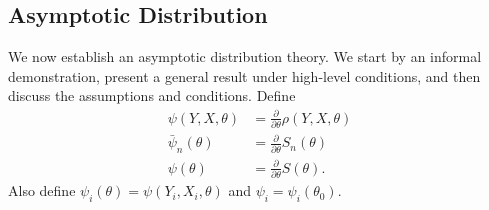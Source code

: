 \documentclass[10pt]{article}
\begin{document}
\subsection{Asymptotic Distribution}
We now establish an asymptotic distribution theory. We start by an informal demonstration, present a general result under high-level conditions, and then discuss the assumptions and conditions. Define
$$
\begin{aligned}
\psi(Y, X, \theta) &=\frac{\partial}{\partial \theta} \rho(Y, X, \theta) \\
\bar{\psi}_{n}(\theta) &=\frac{\partial}{\partial \theta} S_{n}(\theta) \\
\psi(\theta) &=\frac{\partial}{\partial \theta} S(\theta) .
\end{aligned}
$$
Also define $\psi_{i}(\theta)=\psi\left(Y_{i}, X_{i}, \theta\right)$ and $\psi_{i}=\psi_{i}\left(\theta_{0}\right)$.
\end{document}
